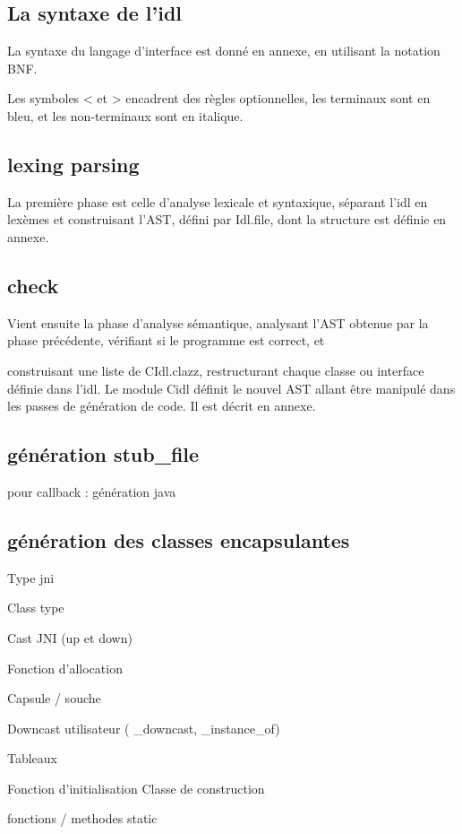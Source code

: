 \documentclass[a4paper, 11pt, notitlepage]{article}
\begin{document}
\subsection{La syntaxe de l'idl}
La syntaxe du langage d'interface est donné en annexe, en utilisant la
notation BNF.

Les symboles < et > encadrent des règles optionnelles,
les terminaux sont en bleu, et les non-terminaux sont en italique.


\subsection{lexing parsing}
La première phase est celle d'analyse lexicale et syntaxique,
séparant l'idl en lexèmes et construisant l'AST, défini par Idl.file,
dont la structure est définie en annexe.

\subsection{check}
Vient ensuite la phase d'analyse sémantique, analysant l'AST obtenue par la
phase précédente, vérifiant si le programme est correct, et

construisant une liste de CIdl.clazz, restructurant chaque classe ou interface définie dans l'idl. 
Le module Cidl définit le nouvel AST allant être manipulé dans les passes de
génération de code. Il est décrit en annexe.

\subsection{génération stub\_file}
pour callback : génération java

\subsection{génération des classes encapsulantes}

Type jni

Class type

Cast JNI (up et down)

Fonction d'allocation

Capsule / souche

Downcast utilisateur (
\_downcast,
\_instance\_of)

Tableaux

Fonction d'initialisation
Classe de construction

fonctions / methodes static
\end{document}
